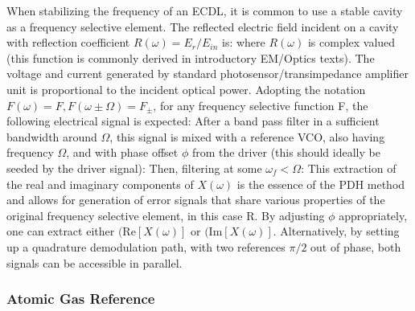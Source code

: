 When stabilizing the frequency of an ECDL, it is common to use a stable cavity as a frequency selective element. The reflected electric field incident on a cavity with reflection coefficient $R(\omega)=E_{r}/E_{in}$ is:
where $R(\omega)$ is complex valued (this function is commonly derived in introductory EM/Optics texts). The voltage and current generated by standard photosensor/transimpedance amplifier unit is proportional to the incident optical power. Adopting the notation $F(\omega) = F, F(\omega \pm \Omega) = F_\pm$, for any frequency selective function F, the following electrical signal is expected:
After a band pass filter in a sufficient bandwidth around $\Omega$, this signal is mixed with a reference VCO, also having frequency $\Omega$, and with phase offset $\phi$ from the driver (this should ideally be seeded by the driver signal):
Then, filtering at some $\omega_f < \Omega$:
This extraction of the real and imaginary components of $X(\omega)$ is the essence of the PDH method and allows for generation of error signals that share various properties of the original frequency selective element, in this case R. By adjusting $\phi$ appropriately, one can extract either $(\mbox{Re}[X(\omega)]$ or $(\mbox{Im}[X(\omega)]$. Alternatively, by setting up a quadrature demodulation path, with two references $\pi/2$ out of phase, both signals can be accessible in parallel.

\subsubsection{Atomic Gas Reference}

